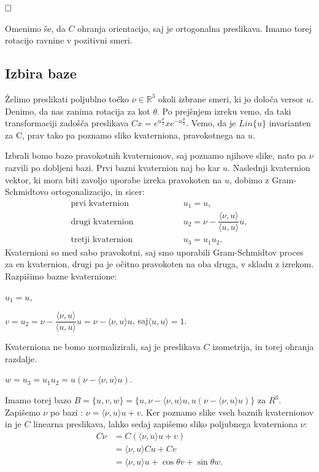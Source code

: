 \documentclass[a4paper,12pt]{article}
\def\R{\mathbb{R}} %
\newcommand{\dotpr}[2]{\langle #1, #2 \rangle}
\def\qed{$\hfill\Box$}   %
\begin{document}
\qed

Omenimo še, da $C$ ohranja orientacijo, saj je ortogonalna preslikava. Imamo torej rotacijo ravnine v pozitivni smeri. ~\cite{weiner2005quaternions}

\subsection{Izbira baze}

Želimo preslikati poljublno točko $\nu \in \R^3$ okoli izbrane smeri, ki jo določa versor $u$. Denimo, da nas zanima rotacija za kot $\theta$.
Po prejšnjem izreku vemo, da taki transformaciji zadošča preslikava $Cx = e^{u\frac{\theta}{2}}xe^{-u\frac{\theta}{2}}$. Vemo, da je $Lin\{u\}$ invarianten za C, prav tako pa poznamo sliko kvaterniona,
pravokotnega na $u$.

Izbrali bomo bazo pravokotnih kvaternionov, saj poznamo njihove slike, nato pa $\nu$ razvili po dobljeni bazi. Prvi bazni kvaternion naj bo kar $u$. Naslednji kvaternion vektor, ki mora biti zavoljo uporabe izreka pravokoten na $u$, dobimo z Gram-Schmidtovo ortogonalizacijo, in sicer:
\begin{align*}
   \text{prvi kvaternion} &\hspace{5em}  u_{1} = u,\\
   \text{drugi kvaternion} &\hspace{5em}   u_{2} = \nu - \dfrac{\dotpr{\nu}{u}}{\dotpr{u}{u}} u,\\
   \text{tretji kvaternion} &\hspace{5em} u_{3} = u_{1} u_{2}.
\end{align*}
Kvaternioni so med sabo pravokotni, saj smo uporabili Gram-Schmidtov proces za en kvaternion, drugi pa je očitno pravokoten na oba druga, v skladu z izrekom. Razpišimo bazne kvaternione:

\begin{center}
   $u_{1} = u$,

   $v = u_{2} = \nu - \dfrac{\dotpr{\nu}{u}}{\dotpr{u}{u}}u = \nu - \dotpr{\nu}{u}u$, saj$\dotpr{u}{u} = 1$.
\end{center}
Kvaterniona ne bomo normalizirali, saj je preslikava $C$ izometrija, in torej ohranja razdalje.

\begin{center}
   $w = u_{3} = u_{1} u_{2} = u (\nu - \dotpr{\nu}{u}u)$.
\end{center}
Imamo torej bazo $B = \{u, v, w\} = \{u, \nu - \dotpr{\nu}{u}u, u(\nu - \dotpr{\nu}{u}u)\}$ za $R^3$.
Zapišemo $\nu$ po bazi : $\nu = \dotpr{\nu}{u}u + v$. Ker poznamo slike vseh baznih kvaternionov in je $C$ linearna preslikava,
lahko sedaj zapišemo sliko poljubnega kvaterniona $\nu$:
\begin{align*}
   C \nu &= C (\dotpr{\nu}{u}u + v)\\
         &= \dotpr{\nu}{u}Cu + Cv\\
         &= \dotpr{\nu}{u}u + \cos\theta v + \sin\theta w.
\end{align*}
\end{document}

